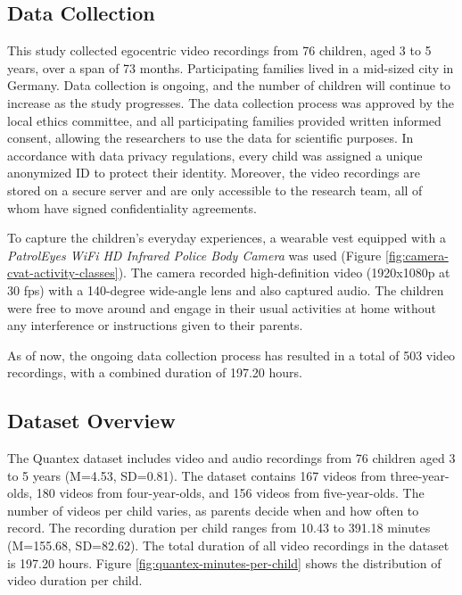 \documentclass[
  man,floatsintext]{apa6}
\begin{document}
\subsection{Data Collection}\label{data-collection}

This study collected egocentric video recordings from 76 children, aged 3 to 5 years, over a span of 73 months. Participating families lived in a mid-sized city in Germany. Data collection is ongoing, and the number of children will continue to increase as the study progresses. The data collection process was approved by the local ethics committee, and all participating families provided written informed consent, allowing the researchers to use the data for scientific purposes. In accordance with data privacy regulations, every child was assigned a unique anonymized ID to protect their identity. Moreover, the video recordings are stored on a secure server and are only accessible to the research team, all of whom have signed confidentiality agreements.

To capture the children's everyday experiences, a wearable vest equipped with a \emph{PatrolEyes WiFi HD Infrared Police Body Camera} was used (Figure \ref{fig:camera-cvat-activity-classes}). The camera recorded high-definition video (1920x1080p at 30 fps) with a 140-degree wide-angle lens and also captured audio. The children were free to move around and engage in their usual activities at home without any interference or instructions given to their parents.

As of now, the ongoing data collection process has resulted in a total of 503 video recordings, with a combined duration of 197.20 hours.

\subsection{Dataset Overview}\label{dataset-overview}

The Quantex dataset includes video and audio recordings from 76 children aged 3 to 5 years (M=4.53, SD=0.81). The dataset contains 167 videos from three-year-olds, 180 videos from four-year-olds, and 156 videos from five-year-olds. The number of videos per child varies, as parents decide when and how often to record. The recording duration per child ranges from 10.43 to 391.18 minutes (M=155.68, SD=82.62). The total duration of all video recordings in the dataset is 197.20 hours. Figure \ref{fig:quantex-minutes-per-child} shows the distribution of video duration per child.
\end{document}
